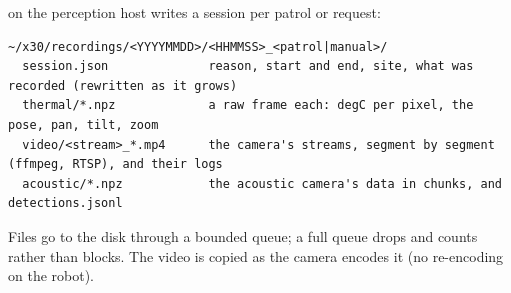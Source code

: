  on the perception host writes a session per patrol or request:

\begin{lstlisting}
~/x30/recordings/<YYYYMMDD>/<HHMMSS>_<patrol|manual>/
  session.json              reason, start and end, site, what was recorded (rewritten as it grows)
  thermal/*.npz             a raw frame each: degC per pixel, the pose, pan, tilt, zoom
  video/<stream>_*.mp4      the camera's streams, segment by segment (ffmpeg, RTSP), and their logs
  acoustic/*.npz            the acoustic camera's data in chunks, and detections.jsonl
\end{lstlisting}

Files go to the disk through a bounded queue; a full queue drops and counts rather than blocks.
The video is copied as the camera encodes it (no re-encoding on the robot).
